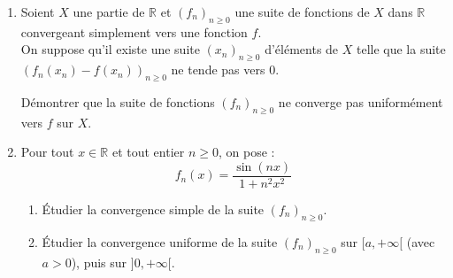\documentclass[a4paper,10pt]{report}
\begin{document}
\begin{Exercice}{} \begin{enumerate}
\item Soient $X$ une partie de $\mathbb{R}$ et $\left( f_{n}\right) _{n \geq 0}$ une suite de fonctions de $X$ dans $\mathbb{R}$ convergeant simplement vers une fonction $f$. \\
On suppose qu'il existe une suite $\left( x_{n}\right)_{n \geq 0}$ d'\'{e}l\'{e}ments de $X$ telle que la suite $\left( f_{n}(x_{n})-f\left( x_{n}\right) \right) _{n \geq 0}$ ne tende pas vers $0$. \medskip

D\'{e}montrer que la suite de fonctions $\left( f_{n}\right) _{n \geq 0}$ ne converge pas uniform\'{e}ment vers $f$ sur $X$.

\item Pour tout $x\in\mathbb{R}$ et tout entier $n \geq 0$, on pose :
$$f_{n}(x) =\dfrac{\sin \left( nx\right) }{1+n^{2}x^{2}}$$
	\begin{enumerate}
	\item \'Etudier la convergence simple de la suite $\left( f_{n}\right)_{n \geq 0}$.
	\item \'Etudier la convergence uniforme de la suite $\left( f_{n}\right)_{n \geq 0}$ sur $[a,+\infty[$ (avec $a>0$),  puis sur $]0,+\infty[$.
	\end{enumerate}
\end{enumerate}
\end{Exercice}

\newpage
\end{document}
